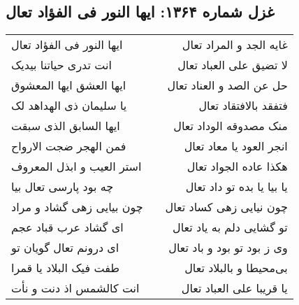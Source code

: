 \begin{center}
\section*{غزل شماره ۱۳۶۴: ایها النور فی الفؤاد تعال}
\label{sec:1364}
\begin{longtable}{l p{0.5cm} r}
ایها النور فی الفؤاد تعال
&&
غایه الجد و المراد تعال
\\
انت تدری حیاتنا بیدیک
&&
لا تضیق علی العباد تعال
\\
ایها العشق ایها المعشوق
&&
حل عن الصد و العناد تعال
\\
یا سلیمان ذی الهداهد لک
&&
فتفقد بالافتقاد تعال
\\
ایها السابق الذی سبقت
&&
منک مصدوقه الوداد تعال
\\
فمن الهجر ضجت الارواح
&&
انجر العود یا معاد تعال
\\
استر العیب و ابذل المعروف
&&
هکذا عاده الجواد تعال
\\
چه بود پارسی تعال بیا
&&
یا بیا یا بده تو داد تعال
\\
چون بیایی زهی گشاد و مراد
&&
چون نیایی زهی کساد تعال
\\
ای گشاد عرب قباد عجم
&&
تو گشایی دلم به یاد تعال
\\
ای درونم تعال گویان تو
&&
وی ز بود تو بود و باد تعال
\\
طفت فیک البلاد یا قمرا
&&
بی‌محیطا و بالبلاد تعال
\\
انت کالشمس اذ دنت و نأت
&&
یا قریبا علی العباد تعال
\\
\end{longtable}
\end{center}
